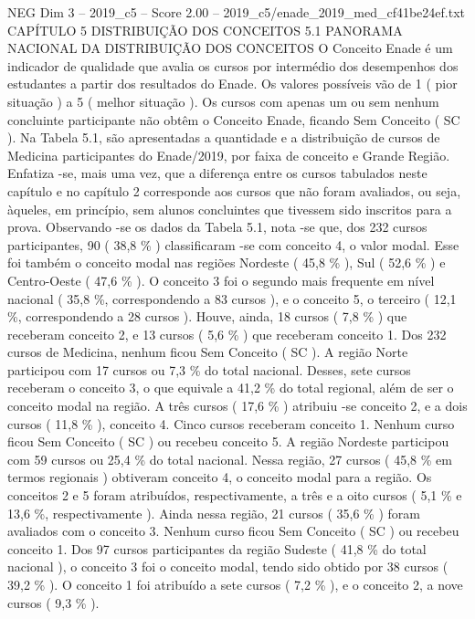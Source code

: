 \begin{textsample}{NEG Dim 3 – 2019\_c5 – Score 2.00 – 2019\_c5/enade\_2019\_med\_cf41be24ef.txt}  \label{ex:f3_neg_191}
CAPÍTULO 5 DISTRIBUIÇÃO DOS CONCEITOS 5.1 PANORAMA NACIONAL DA DISTRIBUIÇÃO DOS CONCEITOS O Conceito Enade é um indicador de qualidade que avalia os cursos por intermédio dos desempenhos dos estudantes a partir dos resultados do Enade.
Os valores possíveis vão de 1 ( pior situação ) a 5 ( melhor situação ).
Os cursos com apenas um ou sem nenhum concluinte participante não obtêm o Conceito Enade, ficando Sem Conceito ( SC ).
Na Tabela 5.1, são apresentadas a quantidade e a distribuição de cursos de Medicina participantes do Enade/2019, por faixa de conceito e Grande Região.
Enfatiza -se, mais uma vez, que a diferença entre os cursos tabulados neste capítulo e no capítulo 2 corresponde aos cursos que não foram avaliados, ou seja, àqueles, em princípio, sem alunos concluintes que tivessem sido inscritos para a prova.
Observando -se os dados da Tabela 5.1, nota -se que, dos 232 cursos participantes, 90 ( 38,8 \% ) classificaram -se com conceito 4, o valor modal.
Esse foi também o conceito modal nas regiões Nordeste ( 45,8 \% ), Sul ( 52,6 \% ) e Centro-Oeste ( 47,6 \% ).
O conceito 3 foi o segundo mais frequente em nível nacional ( 35,8 \%, correspondendo a 83 cursos ), e o conceito 5, o terceiro ( 12,1 \%, correspondendo a 28 cursos ).
Houve, ainda, 18 cursos ( 7,8 \% ) que receberam conceito 2, e 13 cursos ( 5,6 \% ) que receberam conceito 1.
Dos 232 cursos de Medicina, nenhum ficou Sem Conceito ( SC ).
A região Norte participou com 17 cursos ou 7,3 \% do total nacional.
Desses, sete cursos receberam o conceito 3, o que equivale a 41,2 \% do total regional, além de ser o conceito modal na região.
A três cursos ( 17,6 \% ) atribuiu -se conceito 2, e a dois cursos ( 11,8 \% ), conceito 4.
Cinco cursos receberam conceito 1.
Nenhum curso ficou Sem Conceito ( SC ) ou recebeu conceito 5.
A região Nordeste participou com 59 cursos ou 25,4 \% do total nacional.
Nessa região, 27 cursos ( 45,8 \% em termos regionais ) obtiveram conceito 4, o conceito modal para a região.
Os conceitos 2 e 5 foram atribuídos, respectivamente, a três e a oito cursos ( 5,1 \% e 13,6 \%, respectivamente ).
Ainda nessa região, 21 cursos ( 35,6 \% ) foram avaliados com o conceito 3.
Nenhum curso ficou Sem Conceito ( SC ) ou recebeu conceito 1.
Dos 97 cursos participantes da região Sudeste ( 41,8 \% do total nacional ), o conceito 3 foi o conceito modal, tendo sido obtido por 38 cursos ( 39,2 \% ).
O conceito 1 foi atribuído a sete cursos ( 7,2 \% ), e o conceito 2, a nove cursos ( 9,3 \% ).

\end{textsample}
